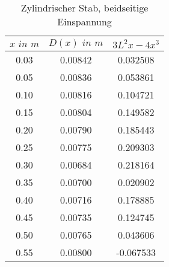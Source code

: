 \documentclass[
  bibliography=totoc,     %
  captions=tableheading,  %
  titlepage=firstiscover, %
]{scrartcl}
\begin{document}
\begin{table}
  \centering
  \caption{Zylindrischer Stab, beidseitige Einspannung}
  \label{tab:data2}
  \begin{tabular}{c c c  }
    \toprule $x \, \,  in \,\, m$ & $D(x) \,\, in \,\,  m$ & $3L^2x-4x^3$ \\
    \midrule
    0.03 & 0.00842 & 0.032508\\
    0.05 & 0.00836 & 0.053861\\
    0.10 & 0.00816 & 0.104721\\
    0.15 & 0.00804 & 0.149582\\
    0.20 & 0.00790 & 0.185443\\
    0.25 & 0.00775 & 0.209303\\
    0.30 & 0.00684 & 0.218164\\
    0.35 & 0.00700 & 0.020902\\
    0.40 & 0.00716 & 0.178885\\
    0.45 & 0.00735 & 0.124745\\
    0.50 & 0.00765 & 0.043606\\
    0.55 & 0.00800 & -0.067533\\
    \bottomrule
  \end{tabular}
\end{table}
\end{document}
